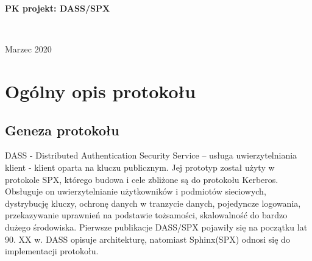 \documentclass[11pt]{article}
\begin{document}
\lstset{language=Python} 

\begin{titlepage}
   \begin{center}
       \vspace*{1cm}
 
       \textbf{PK projekt: DASS/SPX} 
            
       \vspace{1.5cm}

       \\
       \vspace{1cm}

       \vfill
            
       Marzec 2020
            
   \end{center}
\end{titlepage}


\section{Ogólny opis protokołu}
\subsection{Geneza protokołu}
DASS - Distributed Authentication Security Service – usługa uwierzytelniania klient - klient oparta na kluczu publicznym. Jej prototyp został użyty w protokole SPX, którego budowa i cele zbliżone są do protokołu Kerberos. Obsługuje on uwierzytelnianie użytkowników i podmiotów sieciowych, dystrybucję kluczy, ochronę danych w tranzycie danych, pojedyncze logowania, przekazywanie uprawnień na podstawie tożsamości, skalowalność do bardzo dużego środowiska.
Pierwsze publikacje DASS/SPX pojawiły się na początku lat 90. XX w. DASS opisuje architekturę, natomiast Sphinx(SPX) odnosi się do implementacji protokołu.
\end{document}
